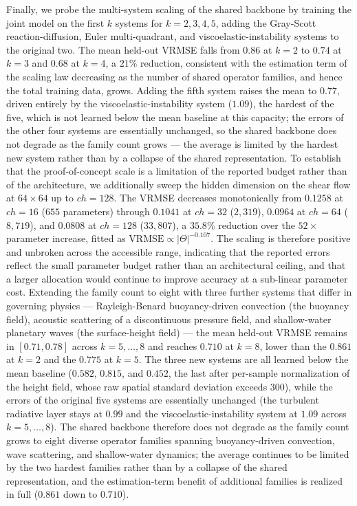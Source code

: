 \documentclass[preprint,12pt]{elsarticle}
\begin{document}
Finally, we probe the multi-system scaling of the shared backbone by training the joint model on the first $k$ systems for $k=2,3,4,5$, adding the Gray-Scott reaction-diffusion, Euler multi-quadrant, and viscoelastic-instability systems to the original two. The mean held-out VRMSE falls from $0.86$ at $k=2$ to $0.74$ at $k=3$ and $0.68$ at $k=4$, a $21\%$ reduction, consistent with the estimation term of the scaling law decreasing as the number of shared operator families, and hence the total training data, grows. Adding the fifth system raises the mean to $0.77$, driven entirely by the viscoelastic-instability system ($1.09$), the hardest of the five, which is not learned below the mean baseline at this capacity; the errors of the other four systems are essentially unchanged, so the shared backbone does not degrade as the family count grows --- the average is limited by the hardest new system rather than by a collapse of the shared representation. To establish that the proof-of-concept scale is a limitation of the reported budget rather than of the architecture, we additionally sweep the hidden dimension on the shear flow at $64\times64$ up to $ch=128$. The VRMSE decreases monotonically from $0.1258$ at $ch=16$ ($655$ parameters) through $0.1041$ at $ch=32$ ($2{,}319$), $0.0964$ at $ch=64$ ($8{,}719$), and $0.0808$ at $ch=128$ ($33{,}807$), a $35.8\%$ reduction over the $52\times$ parameter increase, fitted as $\mathrm{VRMSE}\propto|\Theta|^{-0.107}$. The scaling is therefore positive and unbroken across the accessible range, indicating that the reported errors reflect the small parameter budget rather than an architectural ceiling, and that a larger allocation would continue to improve accuracy at a sub-linear parameter cost. Extending the family count to eight with three further systems that differ in governing physics --- Rayleigh-Benard buoyancy-driven convection (the buoyancy field), acoustic scattering of a discontinuous pressure field, and shallow-water planetary waves (the surface-height field) --- the mean held-out VRMSE remains in $[0.71,0.78]$ across $k=5,\dots,8$ and reaches $0.710$ at $k=8$, lower than the $0.861$ at $k=2$ and the $0.775$ at $k=5$. The three new systems are all learned below the mean baseline ($0.582$, $0.815$, and $0.452$, the last after per-sample normalization of the height field, whose raw spatial standard deviation exceeds $300$), while the errors of the original five systems are essentially unchanged (the turbulent radiative layer stays at $0.99$ and the viscoelastic-instability system at $1.09$ across $k=5,\dots,8$). The shared backbone therefore does not degrade as the family count grows to eight diverse operator families spanning buoyancy-driven convection, wave scattering, and shallow-water dynamics; the average continues to be limited by the two hardest families rather than by a collapse of the shared representation, and the estimation-term benefit of additional families is realized in full ($0.861$ down to $0.710$).
\end{document}
